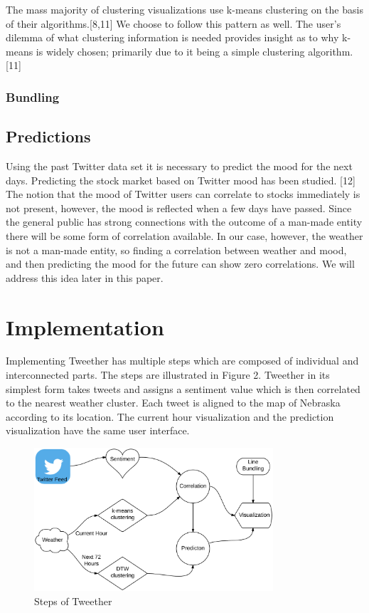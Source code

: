 \documentclass[journal]{vgtc}                %
\begin{document}
The mass majority of clustering visualizations use k-means clustering on the basis of their algorithms.[8,11] We choose to follow this pattern as well. The user's dilemma of what clustering information is needed provides insight as to why k-means is widely chosen; primarily due to it being a simple clustering algorithm.[11]

\subsubsection{Bundling}

\newpage

\subsection{Predictions}

Using the past Twitter data set it is necessary to predict the mood for the next days. Predicting the stock market based on Twitter mood has been studied. [12] The notion that the mood of Twitter users can correlate to stocks immediately is not present, however, the mood is reflected when a few days have passed. Since the general public has strong connections with the outcome of a man-made entity there will be some form of correlation available. In our case, however, the weather is not a man-made entity, so finding a correlation between weather and mood, and then predicting the mood for the future can show zero correlations. We will address this idea later in this paper.




\section{Implementation}

Implementing Tweether has multiple steps which are composed of individual and interconnected parts. The steps are illustrated in Figure 2. Tweether in its simplest form takes tweets and assigns a sentiment value which is then correlated to the nearest weather cluster. Each tweet is aligned to the map of Nebraska according to its location. The current hour visualization and the prediction visualization have the same user interface.

\begin{figure}[htb]
 \centering
 \includegraphics[width=3.5in]{steps}
 \caption{Steps of Tweether}
\end{figure}
\end{document}
